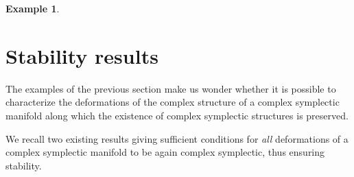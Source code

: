 \documentclass[a4paper]{amsart}
\theoremstyle{definition}
\newtheorem{example}[theorem]{Example}
\theoremstyle{remark}
\numberwithin{equation}{section}
\begin{document}
\begin{example}

\end{example}

\section{Stability results}\label{stability}

The examples of the previous section make us wonder whether it is possible to characterize the deformations of the complex structure of a complex symplectic manifold along which the existence of complex symplectic structures is preserved.

We recall two existing results giving sufficient conditions for {\em all} deformations of a complex symplectic manifold to be again complex symplectic, thus ensuring stability.
\end{document}
